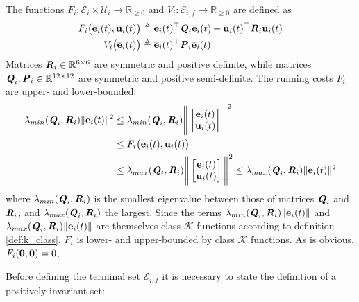 


The functions
$F_i : \mathcal{E}_i \times \mathcal{U}_i \to \mathbb{R}_{\geq 0}$ and
$V_i: \mathcal{E}_{i,f} \to \mathbb{R}_{\geq 0}$ are defined as
\begin{align}
  F_i \big(\overline{\bm{\mathbf{e}}}_i(t), \overline{\bm{\mathbf{u}}}_i(t)\big)
  &\triangleq \overline{\bm{\mathbf{e}}}_i(t)^{\top} \bm{\mathit{Q}}_i \overline{\bm{\mathbf{e}}}_i(t) + \overline{\bm{\mathbf{u}}}_i(t)^{\top} \bm{\mathit{R}}_i \overline{\bm{\mathbf{u}}}_i(t)\\
  V_i \big(\overline{\bm{\mathbf{e}}}_i(t)\big) & \triangleq \overline{\bm{\mathbf{e}}}_i(t)^{\top} \bm{\mathit{P}}_i \overline{\bm{\mathbf{e}}}_i(t)
\end{align}
Matrices $\bm{\mathit{R}}_i \in \mathbb{R}^{6 \times 6}$ are symmetric and positive
definite, while matrices $\bm{\mathit{Q}}_i, \bm{\mathit{P}}_i \in \mathbb{R}^{12 \times 12}$
are symmetric and positive semi-definite. The running costs $F_i$ are
upper- and lower-bounded:
\begin{align}
  \lambda_{min}(\bm{\mathit{Q}}_i, \bm{\mathit{R}}_i)\|\bm{\mathbf{e}}_i(t)\|^2 &\leq
  \lambda_{min}(\bm{\mathit{Q}}_i, \bm{\mathit{R}}_i) \Bigg\| \begin{bmatrix}
      \bm{\mathbf{e}}_i(t) \\
      \bm{\mathbf{u}}_i(t)
    \end{bmatrix}\Bigg\|^2  \\
    &\leq F_i \big(\bm{\mathbf{e}}_i(t), \bm{\mathbf{u}}_i(t)\big) \\
    &\leq \lambda_{max}(\bm{\mathit{Q}}_i, \bm{\mathit{R}}_i) \Bigg\| \begin{bmatrix}
      \bm{\mathbf{e}}_i(t) \\
      \bm{\mathbf{u}}_i(t)
    \end{bmatrix}\Bigg\|^2 \leq
  \lambda_{max}(\bm{\mathit{Q}}_i, \bm{\mathit{R}}_i) \|\bm{\mathbf{e}}_i(t)\|^2
\end{align}
where $\lambda_{min}(\bm{\mathit{Q}}_i, \bm{\mathit{R}}_i)$ is the smallest eigenvalue between
those of matrices $\bm{\mathit{Q}}_i$ and $\bm{\mathit{R}}_i$, and
$\lambda_{max}(\bm{\mathit{Q}}_i, \bm{\mathit{R}}_i)$ the largest. Since the terms
$\lambda_{min}(\bm{\mathit{Q}}_i, \bm{\mathit{R}}_i) \|\bm{\mathbf{e}}_i(t)\|$ and
$\lambda_{max}(\bm{\mathit{Q}}_i, \bm{\mathit{R}}_i) \|\bm{\mathbf{e}}_i(t)\|$ are themselves
class $\mathcal{K}$ functions according to definition \eqref{def:k_class},
$F_i$ is lower- and upper-bounded by class $\mathcal{K}$ functions. As is
obvious, $F_i(\bm{\mathbf{0}}, \bm{\mathbf{0}}) = 0$.


Before defining the terminal set
$\mathcal{E}_{i,f}$ it is necessary to state the definition of a positively
invariant set:

